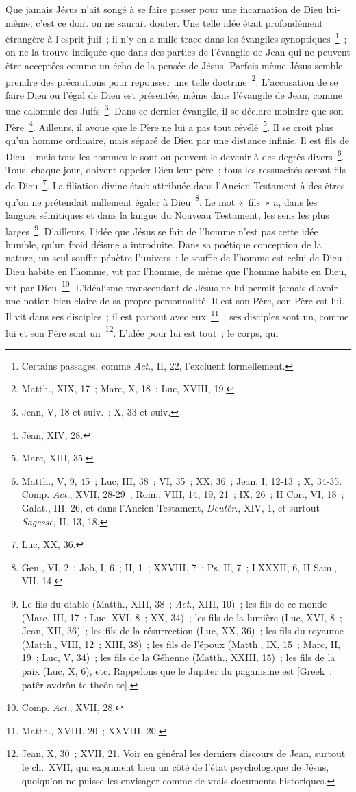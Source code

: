 \documentclass[french,twoside]{book} %
\begin{document}
Que jamais Jésus n’ait songé à se faire passer pour une incarnation de Dieu lui-même, c’est ce dont on ne saurait douter. Une telle idée était profondément étrangère à l’esprit juif ; il n’y en a nulle trace dans les évangiles synoptiques \footnote{ Certains passages, comme {\itshape Act}., II, 22, l’excluent formellement.} ; on ne la trouve indiquée que dans des parties de l’évangile de Jean qui ne peuvent être acceptées comme un écho de la pensée de Jésus. Parfois même Jésus semble prendre des précautions pour repousser une telle doctrine \footnote{Matth., XIX, 17 ; Marc, X, 18 ; Luc, XVIII, 19.}. L’accusation de se faire Dieu ou l’égal de Dieu est présentée, même dans l’évangile de Jean, comme une calomnie des Juifs \footnote{Jean, V, 18 et suiv. ; X, 33 et suiv.}. Dans ce dernier évangile, il se déclare moindre que son Père \footnote{Jean, XIV, 28.}. Ailleurs, il avoue que le Père ne lui a pas tout révélé \footnote{Marc, XIII, 35.}. Il se croit plus qu’un homme ordinaire, mais séparé de Dieu par une distance infinie. Il est fils de Dieu ; mais tous les hommes le sont ou peuvent le devenir à des degrés divers \footnote{ Matth., V, 9, 45 ; Luc, III, 38 ; VI, 35 ; XX, 36 ; Jean, I, 12-13 ; X, 34-35. Comp. {\itshape Act}., XVII, 28-29 ; Rom., VIII, 14, 19, 21 ; IX, 26 ; II Cor., VI, 18 ; Galat., III, 26, et dans l’Ancien Testament, {\itshape Deutér}., XIV, 1, et surtout {\itshape Sagesse}, II, 13, 18.}. Tous, chaque jour, doivent appeler Dieu leur père ; tous les ressuscités seront fils de Dieu \footnote{Luc, XX, 36.}. La filiation divine était attribuée dans l’Ancien Testament à des êtres qu’on ne prétendait nullement égaler à Dieu \footnote{Gen., VI, 2 ; Job, I, 6 ; II, 1 ; XXVIII, 7 ; Ps. II, 7 ; LXXXII, 6, II Sam., VII, 14.}. Le mot « fils » a, dans les langues sémitiques et dans la langue du Nouveau Testament, les sens les plus larges \footnote{ Le fils du diable (Matth., XIII, 38 ; {\itshape Act}., XIII, 10) ; les fils de ce monde (Marc, III, 17 ; Luc, XVI, 8 ; XX, 34) ; les fils de la lumière (Luc, XVI, 8 ; Jean, XII, 36) ; les fils de la résurrection (Luc, XX, 36) ; les fils du royaume (Matth., VIII, 12 ; XIII, 38) ; les fils de l’époux (Matth., IX, 15 ; Marc, II, 19 ; Luc, V, 34) ; les fils de la Géhenne (Matth., XXIII, 15) ; les fils de la paix (Luc, X, 6), etc. Rappelons que le Jupiter du paganisme est [Greek : patêr avdrôn te theôn te].}. D’ailleurs, l’idée que Jésus se fait de l’homme n’est pas cette idée humble, qu’un froid déisme a introduite. Dans sa poétique conception de la nature, un seul souffle pénètre l’univers : le souffle de l’homme est celui de Dieu ; Dieu habite en l’homme, vit par l’homme, de même que l’homme habite en Dieu, vit par Dieu \footnote{ Comp. {\itshape Act}., XVII, 28.}. L’idéalisme transcendant de Jésus ne lui permit jamais d’avoir une notion bien claire de sa propre personnalité. Il est son Père, son Père est lui. Il vit dans ses disciples ; il est partout avec eux \footnote{Matth., XVIII, 20 ; XXVIII, 20.} ; ses disciples sont un, comme lui et son Père sont un \footnote{Jean, X, 30 ; XVII, 21. Voir en général les derniers discours de Jean, surtout le ch. XVII, qui expriment bien un côté de l’état psychologique de Jésus, quoiqu’on ne puisse les envisager comme de vrais documents historiques.}. L’idée pour lui est tout ; le corps, qui 
\end{document}
